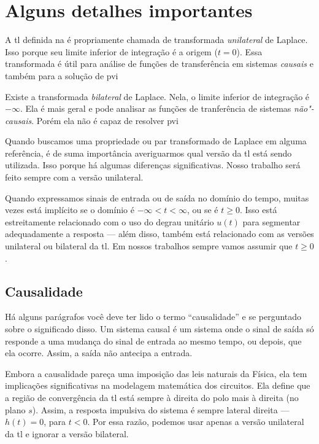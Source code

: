 \section{Alguns detalhes importantes}

A \ac{tl} definida na  é propriamente chamada de transformada \emph{unilateral} de Laplace. Isso porque seu limite inferior de integração é a origem ($t=0$). Essa transformada é útil para análise de funções de transferência em sistemas \emph{causais} e também para a solução de \ac{pvi}

Existe a transformada \emph{bilateral} de Laplace. Nela, o limite inferior de integração é $-\infty$. Ela é mais geral e pode analisar as funções de tranferência de sistemas \emph{não"-causais}. Porém ela não é capaz de resolver \ac{pvi}

Quando buscamos uma propriedade ou par transformado de Laplace em alguma referência, é de suma importância averiguarmos qual versão da \ac{tl} está sendo utilizada. Isso porque há algumas diferenças significativas. Nosso trabalho será feito sempre com a versão unilateral.

Quando expressamos sinais de entrada ou de saída no domínio do tempo, muitas vezes está implícito se o domínio é $-\infty<t<\infty$, ou se é $t\geq0$. Isso está estreitamente relacionado com o uso do degrau unitário $u(t)$ para segmentar adequadamente a resposta --- além disso, também está relacionado com as versões unilateral ou bilateral da \ac{tl}. Em nossos trabalhos sempre vamos assumir que $t\geq0$.

\subsection{Causalidade}

Há alguns parágrafos você deve ter lido o termo \enquote{causalidade} e se perguntado sobre o significado disso. Um sistema causal é um sistema onde o sinal de saída só responde a uma mudança do sinal de entrada ao mesmo tempo, ou depois, que ela ocorre. Assim, a saída não antecipa a entrada.

Embora a causalidade pareça uma imposição das leis naturais da Física, ela tem implicações significativas na modelagem matemática dos circuitos. Ela define que a região de convergência da \ac{tl} está sempre à direita do polo mais à direita (no plano $s$). Assim, a resposta impulsiva do sistema é sempre lateral direita --- $h(t)=0$, para $t<0$. Por essa razão, podemos usar apenas a versão unilateral da \ac{tl} e ignorar a versão bilateral.

